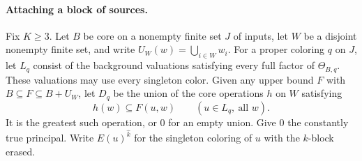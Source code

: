 \paragraph{Attaching a block of sources.}
Fix $K\geq3$. Let $B$ be core on a nonempty finite set $J$ of inputs, let $W$ be a
disjoint nonempty finite set, and write $U_W(w)=\bigcup_{i\in W}w_i$.
For a proper coloring $q$ on $J$, let $L_q$ consist of the background
valuations satisfying every full factor of $\Theta_{B,q}$. These
valuations may use every singleton color. Given any upper bound $F$
with $B\subseteq F\subseteq B+U_W$, let $D_q$ be the union of the
core operations $h$ on $W$ satisfying
\[
 h(w)\subseteq F(u,w)\qquad(u\in L_q,\ \text{all } w).
\]
It is the greatest such operation, or $0$ for an empty union. Give
$0$ the constantly true principal. Write $E(u)^{\widehat k}$ for the
singleton coloring of $u$ with the $k$-block erased.

